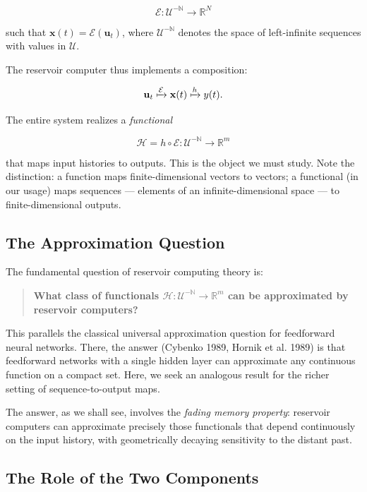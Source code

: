 \[
\mathcal{E}: \mathcal{U}^{-\mathbb{N}} \to \mathbb{R}^N
\]

such that $\mathbf{x}(t) = \mathcal{E}(\mathbf{u}_t)$, where $\mathcal{U}^{-\mathbb{N}}$
denotes the space of left-infinite sequences with values in $\mathcal{U}$.

The reservoir computer thus implements a composition:

\[
\mathbf{u}_t \xmapsto{\mathcal{E}} \mathbf{x}(t) \xmapsto{h} y(t).
\]

The entire system realizes a \textit{functional}

\[
\mathcal{H} = h \circ \mathcal{E}: \mathcal{U}^{-\mathbb{N}} \to \mathbb{R}^m
\]

that maps input histories to outputs. This is the object we must study. Note the
distinction: a function maps finite-dimensional vectors to vectors; a functional (in
our usage) maps sequences --- elements of an infinite-dimensional space --- to
finite-dimensional outputs.

\subsection{The Approximation Question}\label{sec:15.1.2}

The fundamental question of reservoir computing theory is:

\begin{quote}
\textbf{What class of functionals $\mathcal{H}: \mathcal{U}^{-\mathbb{N}} \to \mathbb{R}^m$ can be approximated by reservoir computers?}
\end{quote}

This parallels the classical universal approximation question for feedforward neural
networks. There, the answer (Cybenko 1989, Hornik et al. 1989) is that feedforward
networks with a single hidden layer can approximate any continuous function on a
compact set. Here, we seek an analogous result for the richer setting of
sequence-to-output maps.

The answer, as we shall see, involves the \textit{fading memory property}: reservoir
computers can approximate precisely those functionals that depend continuously on
the input history, with geometrically decaying sensitivity to the distant past.

\subsection{The Role of the Two Components}\label{sec:15.1.3}

